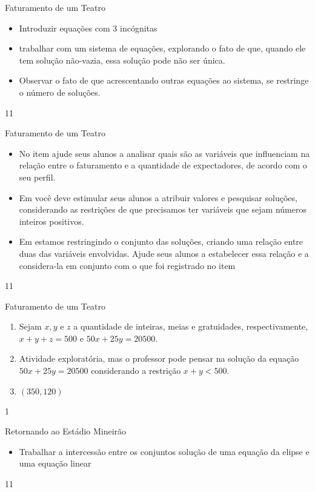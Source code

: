 \cleardoublepage
\def\currentcolor{session1}
\begin{objectives}{Faturamento de um Teatro}
{
\begin{itemize}
\item Introduzir equações com 3 incógnitas
\item trabalhar com um sistema de equações, explorando o fato de que, quando ele tem solução não-vazia, essa solução pode não ser única.
\item Observar o fato de que acrescentando outras equações ao sistema, se restringe o número de soluções.
\end{itemize}
}{1}{1}
\end{objectives}
\begin{sugestions}{Faturamento de um Teatro}
{
\begin{itemize}
\item No item  ajude seus alunos a analisar quais são as variáveis que influenciam na relação entre o faturamento e a quantidade de expectadores, de acordo com o seu perfil. 
\item Em  você deve estimular seus alunos a atribuir valores e pesquisar soluções, considerando as restrições de que precisamos ter variáveis que sejam números inteiros positivos. 
\item Em  estamos restringindo o conjunto das soluções, criando uma relação entre duas das variáveis envolvidas. Ajude seus alunos a estabelecer essa relação e a considera-la em conjunto com o que foi registrado no item 
\end{itemize}
}{1}{1}
\end{sugestions}
\begin{answer}{Faturamento de um Teatro}
{
\begin{enumerate}
\item Sejam $x,y$ e $z$ a quantidade de inteiras, meias e gratuidades, respectivamente, $x+y+z=500$ e $50x+25y=20500.$
\item Atividade exploratória, mas o professor pode pensar na solução da equação $50x+25y=20500$ considerando a restrição $x+y<500$.
\item $(350,120)$
\end{enumerate}
}{1}
\end{answer}
\begin{objectives}{Retornando ao Estádio Mineirão}
{
\begin{itemize}
\item Trabalhar a intercessão entre os  conjuntos solução de uma equação da elipse e uma equação linear
\end{itemize}
}{1}{1}
\end{objectives}
